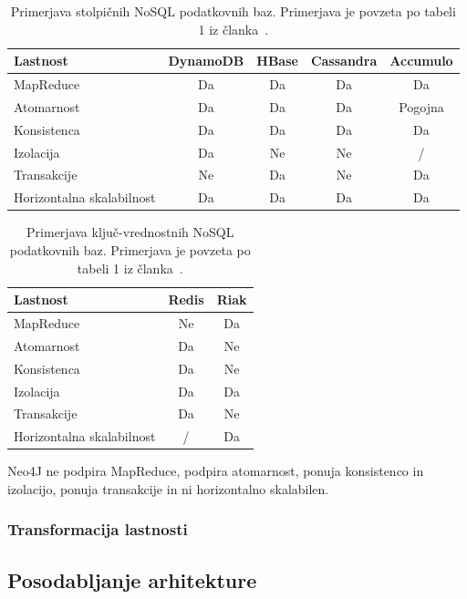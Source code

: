 \begin{table}[H]
    \centering
    \begin{tabularx}{\textwidth}{L S S S S }
        Lastnost                  & DynamoDB & HBase & Cassandra & Accumulo \\ \hline
        MapReduce                 & Da       & Da    & Da        & Da       \\
        Atomarnost                & Da       & Da    & Da        & Pogojna  \\
        Konsistenca               & Da       & Da    & Da        & Da       \\
        Izolacija                 & Da       & Ne    & Ne        & /        \\
        Transakcije               & Ne       & Da    & Ne        & Da       \\
        Horizontalna skalabilnost & Da       & Da    & Da        & Da       \\
    \end{tabularx}

    \caption{Primerjava stolpičnih NoSQL podatkovnih baz.
        Primerjava je povzeta po tabeli 1 iz članka~\cite{nosql}.}
    \label{tab:nosql-comparison-column}
\end{table}

\begin{table}[H]
    \centering
    \begin{tabularx}{\textwidth}{L S S}
        Lastnost                  & Redis & Riak \\ \hline
        MapReduce                 & Ne    & Da   \\
        Atomarnost                & Da    & Ne   \\
        Konsistenca               & Da    & Ne   \\
        Izolacija                 & Da    & Da   \\
        Transakcije               & Da    & Ne   \\
        Horizontalna skalabilnost & /     & Da   \\
    \end{tabularx}

    \caption{Primerjava ključ-vrednostnih NoSQL podatkovnih baz.
        Primerjava je povzeta po tabeli 1 iz članka~\cite{nosql}.}
    \label{tab:nosql-comparison-key-value}
\end{table}

Neo4J ne podpira MapReduce, podpira atomarnost, ponuja konsistenco in izolacijo,
ponuja transakcije in ni horizontalno skalabilen.

\subsubsection{Transformacija lastnosti}

\subsection{Posodabljanje arhitekture}